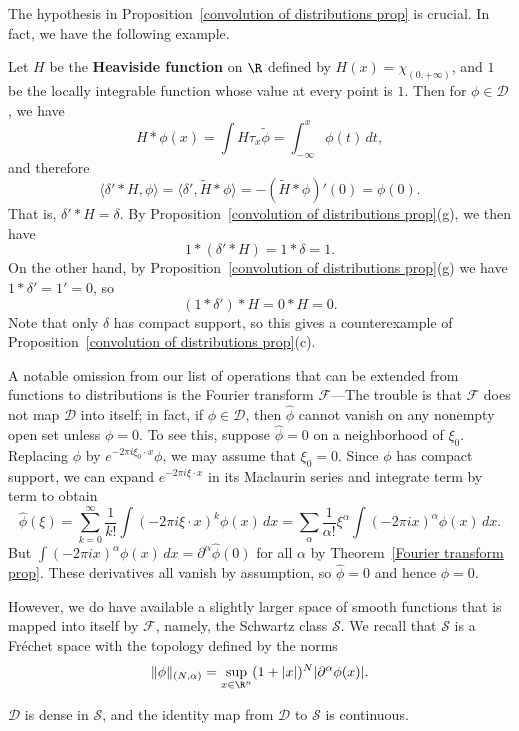The hypothesis in Proposition~\ref{convolution of distributions prop} is crucial. In fact, we have the following example.
\begin{example}
Let $H$ be the \textbf{Heaviside function} on $\R$ defined by $H(x)=\chi_{(0,+\infty)}$, and $1$ be the locally integrable function whose value at every point is $1$. Then for $\phi\in\mathscr{D}$, we have
\[H\ast\phi(x)=\int H\tau_x\tilde{\phi}=\int_{-\infty}^{x}\phi(t)\,dt,\]
and therefore
\[\langle\delta'\ast H,\phi\rangle=\langle\delta',\widetilde{H}\ast\phi\rangle=-(\widetilde{H}\ast\phi)'(0)=\phi(0).\]
That is, $\delta'\ast H=\delta$. By Proposition~\ref{convolution of distributions prop}(g), we then have
\[1\ast(\delta'\ast H)=1\ast\delta=1.\]
On the other hand, by Proposition~\ref{convolution of distributions prop}(g) we have $1\ast\delta'=1'=0$, so
\[(1\ast\delta')\ast H=0\ast H=0.\]
Note that only $\delta$ has compact support, so this gives a counterexample of Proposition~\ref{convolution of distributions prop}(c).
\end{example}
A notable omission from our list of operations that can be extended from functions to distributions is the Fourier transform $\mathscr{F}$---The trouble is that $\mathscr{F}$ does not map $\mathscr{D}$ into itself; in fact, if $\phi\in\mathscr{D}$, then $\hat{\phi}$ cannot vanish on any nonempty open set unless $\phi=0$. To see this, suppose $\hat{\phi}=0$ on a neighborhood of $\xi_0$. Replacing $\phi$ by $e^{-2\pi i\xi_0\cdot x}\phi$, we may assume that $\xi_0=0$. Since $\phi$ has compact support, we can expand $e^{-2\pi i\xi\cdot x}$ in its Maclaurin series and integrate term by term to obtain
\[\hat{\phi}(\xi)=\sum_{k=0}^{\infty}\frac{1}{k!}\int(-2\pi i\xi\cdot x)^k\phi(x)\,dx=\sum_\alpha\frac{1}{\alpha!}\xi^\alpha\int(-2\pi ix)^\alpha\phi(x)\,dx.\]
But $\int(-2\pi ix)^\alpha\phi(x)\,dx=\partial^\alpha\hat{\phi}(0)$ for all $\alpha$ by Theorem~\ref{Fourier transform prop}. These derivatives all vanish by assumption, so $\hat{\phi}=0$ and hence $\phi=0$.\par
However, we do have available a slightly larger space of smooth functions that is mapped into itself by $\mathcal{F}$, namely, the Schwartz class $\mathscr{S}$. We recall that $\mathscr{S}$ is a Fr\'echet space with the topology defined by the norms
\[\|\phi\|_{(N,\alpha)}=\sup_{x\in\R^n}(1+|x|)^N|\partial^\alpha\phi(x)|.\]
\begin{proposition}\label{test function dense in schwarz}
$\mathscr{D}$ is dense in $\mathscr{S}$, and the identity map from $\mathscr{D}$ to $\mathscr{S}$ is continuous.
\end{proposition}
